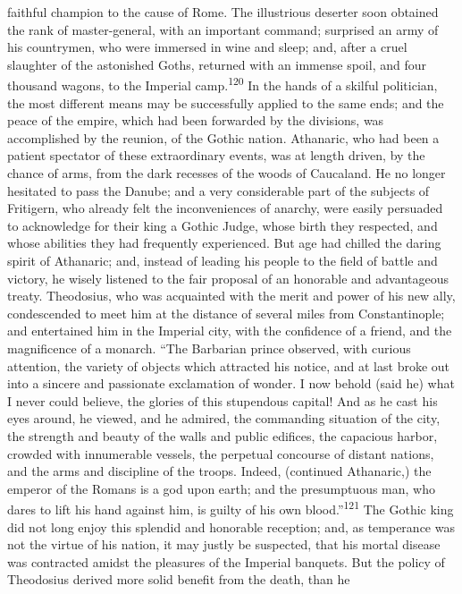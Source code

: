 faithful champion to the cause of Rome. The illustrious deserter
soon obtained the rank of master-general, with an important
command; surprised an army of his countrymen, who were immersed
in wine and sleep; and, after a cruel slaughter of the astonished
Goths, returned with an immense spoil, and four thousand wagons,
to the Imperial camp.\textsuperscript{120} In the hands of a skilful politician,
the most different means may be successfully applied to the same
ends; and the peace of the empire, which had been forwarded by
the divisions, was accomplished by the reunion, of the Gothic
nation. Athanaric, who had been a patient spectator of these
extraordinary events, was at length driven, by the chance of
arms, from the dark recesses of the woods of Caucaland. He no
longer hesitated to pass the Danube; and a very considerable part
of the subjects of Fritigern, who already felt the inconveniences
of anarchy, were easily persuaded to acknowledge for their king a
Gothic Judge, whose birth they respected, and whose abilities
they had frequently experienced. But age had chilled the daring
spirit of Athanaric; and, instead of leading his people to the
field of battle and victory, he wisely listened to the fair
proposal of an honorable and advantageous treaty. Theodosius, who
was acquainted with the merit and power of his new ally,
condescended to meet him at the distance of several miles from
Constantinople; and entertained him in the Imperial city, with
the confidence of a friend, and the magnificence of a monarch.
“The Barbarian prince observed, with curious attention, the
variety of objects which attracted his notice, and at last broke
out into a sincere and passionate exclamation of wonder. I now
behold (said he) what I never could believe, the glories of this
stupendous capital! And as he cast his eyes around, he viewed,
and he admired, the commanding situation of the city, the
strength and beauty of the walls and public edifices, the
capacious harbor, crowded with innumerable vessels, the perpetual
concourse of distant nations, and the arms and discipline of the
troops. Indeed, (continued Athanaric,) the emperor of the Romans
is a god upon earth; and the presumptuous man, who dares to lift
his hand against him, is guilty of his own blood.”\textsuperscript{121} The Gothic
king did not long enjoy this splendid and honorable reception;
and, as temperance was not the virtue of his nation, it may
justly be suspected, that his mortal disease was contracted
amidst the pleasures of the Imperial banquets. But the policy of
Theodosius derived more solid benefit from the death, than he

